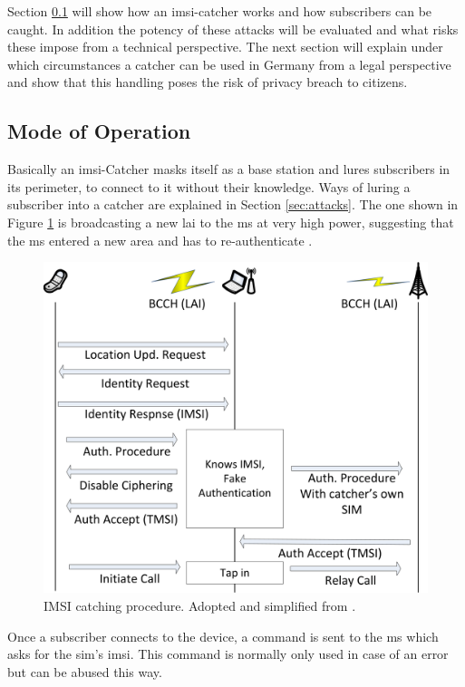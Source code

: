 Section \ref{sec:catcher_operation} will show how an \gls{imsi}-catcher works and how subscribers can be caught.
In addition the potency of these attacks will be evaluated and what risks these impose from a technical perspective.
The next section will explain under which circumstances a catcher can be used in Germany from a legal perspective and show that this handling poses the risk of privacy breach to citizens.

\subsection{Mode of Operation}
\label{sec:catcher_operation}
Basically an \gls{imsi}-Catcher masks itself as a base station and lures subscribers in its perimeter, to connect to it without their knowledge.
Ways of luring a subscriber into a catcher are explained in Section \ref{sec:attacks}.
The one shown in Figure \ref{fig:catcher_catch} is broadcasting a new \gls{lai} to the \gls{ms} at very high power, suggesting that the \gls{ms} entered a new area and has to re-authenticate \cite{mueller}.

\begin{figure}
	\centering
	\includegraphics{../Images/catcher_attack}
	\caption{IMSI catching procedure. Adopted and simplified from \cite{mueller}.}
	\label{fig:catcher_catch}
\end{figure}

Once a subscriber connects to the device, a command is sent to the \gls{ms} which asks for the \gls{sim}'s \gls{imsi}.
This command is normally only used in case of an error \cite{fox} but can be abused this way.

